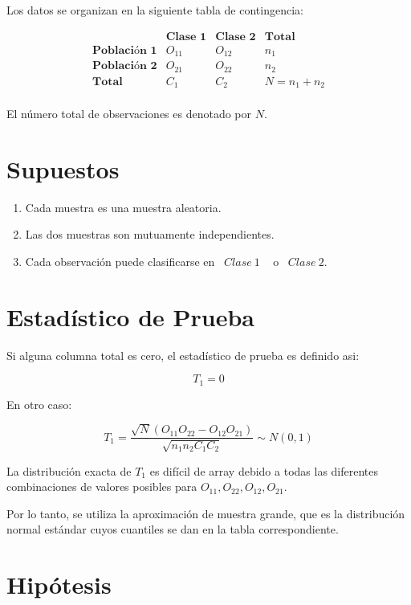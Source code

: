 \documentclass[
  a4paper,
  oneside,
  openany]{book}
\begin{document}
Los datos se organizan en la siguiente tabla de contingencia:

\[
\begin{array}{c|c|c|c}
 & \textbf{Clase 1} & \textbf{Clase 2} & \textbf{Total}     \\
\hline
\textbf{Población 1} & O_{11} & O_{12} & n_{1}   \\
\hline
\textbf{Población 2} & O_{21} & O_{22} & n_{2}\\
\hline
\textbf{Total}       & C_{1} & C_{2}   & N=n_{1}+n_{2} \\
\end{array}
\]

El número total de observaciones es denotado por \(N\).

\hypertarget{supuestos-9}{%
\section{Supuestos}\label{supuestos-9}}

\begin{enumerate}
\def\labelenumi{\arabic{enumi})}
\item
  Cada muestra es una muestra aleatoria.
\item
  Las dos muestras son mutuamente independientes.
\item
  Cada observación puede clasificarse en ~\(Clase\  1\) ~ o ~\(Clase\ 2\).
\end{enumerate}

\hypertarget{estaduxedstico-de-prueba-9}{%
\section{Estadístico de Prueba}\label{estaduxedstico-de-prueba-9}}

Si alguna columna total es cero, el estadístico de prueba es definido asi:

\[T_{1}=0\]

En otro caso:

\[T_{1}=\frac{\sqrt{N}(O_{11}O_{22}-O_{12}O_{21})}{\sqrt{n_{1}n_{2}C_{1}C_{2}}}\sim N(0,1)\]

La distribución exacta de \(T_1\) es difícil de array debido a todas las diferentes combinaciones de valores posibles para \(O_{11},O_{22},O_{12},O_{21}\).

Por lo tanto, se utiliza la aproximación de muestra grande, que es la distribución normal estándar cuyos cuantiles se dan en la tabla correspondiente.

\hypertarget{hipuxf3tesis-9}{%
\section{Hipótesis}\label{hipuxf3tesis-9}}
\end{document}
